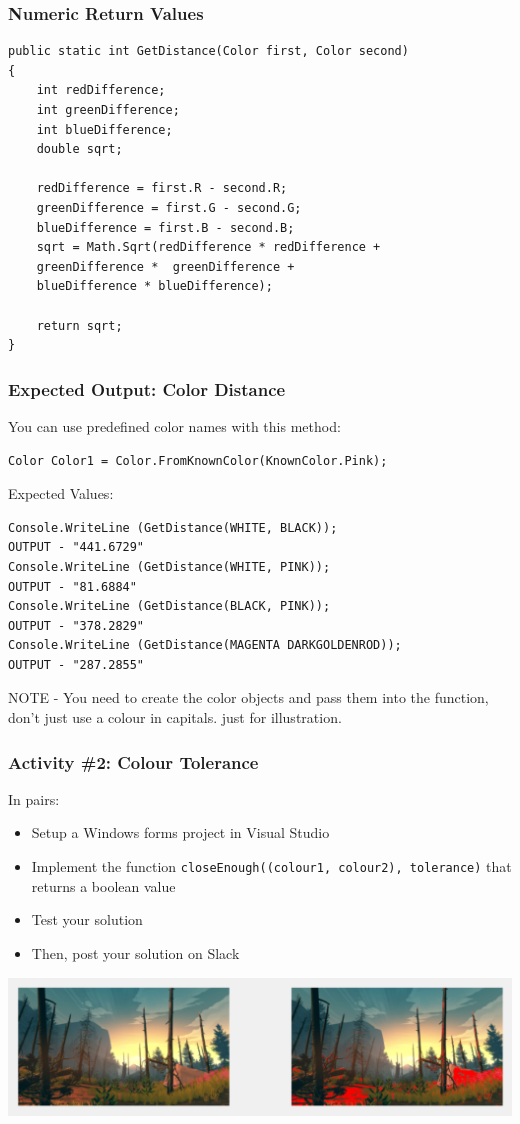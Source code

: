 \begin{frame}[fragile]
	\frametitle{Numeric Return Values}
	
\begin{lstlisting}
public static int GetDistance(Color first, Color second)
{
	int redDifference;
	int greenDifference;
	int blueDifference;
	double sqrt;

	redDifference = first.R - second.R;
	greenDifference = first.G - second.G;
	blueDifference = first.B - second.B;
	sqrt = Math.Sqrt(redDifference * redDifference + 
	greenDifference *  greenDifference +
	blueDifference * blueDifference);

	return sqrt;		
}
\end{lstlisting}


\end{frame}

\begin{frame}[fragile]
	\frametitle{Expected Output: Color Distance}
 You can use predefined color names with this method:
\begin{lstlisting}
Color Color1 = Color.FromKnownColor(KnownColor.Pink);	
\end{lstlisting}
Expected Values:	
\begin{lstlisting}
Console.WriteLine (GetDistance(WHITE, BLACK));
OUTPUT - "441.6729"
Console.WriteLine (GetDistance(WHITE, PINK));
OUTPUT - "81.6884"
Console.WriteLine (GetDistance(BLACK, PINK));
OUTPUT - "378.2829"
Console.WriteLine (GetDistance(MAGENTA DARKGOLDENROD));
OUTPUT - "287.2855"
\end{lstlisting}
NOTE - You need to create the color objects and pass them into the function, don't just use a colour in capitals. just for illustration.  
\end{frame}

\begin{frame}
	\frametitle{Activity \#2: Colour Tolerance}
	
	In pairs:
	
	\vspace{.5em}
	
	\begin{itemize}		
		\item Setup a Windows forms project in Visual Studio
		\item Implement the function \texttt{closeEnough((colour1, colour2), tolerance)} that returns a boolean value
		\item Test your solution
		\item Then, post your solution on Slack
	\end{itemize}
	\vspace{.5em}
\includegraphics[scale=0.5]{GoingRed}
\end{frame}

